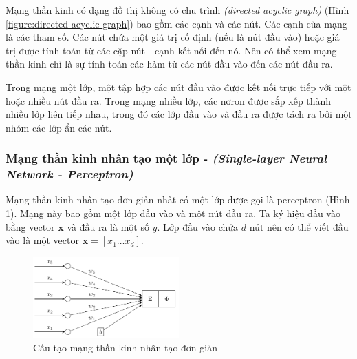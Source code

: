 Mạng thần kinh có dạng đồ thị không có chu trình \textit{(directed acyclic graph)} (Hình \ref{figure:directed-acyclic-graph}) bao gồm các cạnh và các nút. Các cạnh của mạng là các tham số. Các nút chứa một giá trị cố định (nếu là nút đầu vào) hoặc giá trị được tính toán từ các cặp nút - cạnh kết nối đến nó. Nên có thể xem mạng thần kinh chỉ là sự tính toán các hàm từ các nút đầu vào đến các nút đầu ra.

Trong mạng một lớp, một tập hợp các nút đầu vào được kết nối trực tiếp với một hoặc nhiều nút đầu ra. Trong mạng nhiều lớp, các nơron được sắp xếp thành nhiều lớp liên tiếp nhau, trong đó các lớp đầu vào và đầu ra được tách ra bởi một nhóm các lớp ẩn các nút.

\subsubsection{Mạng thần kinh nhân tạo một lớp - \textit{(Single-layer Neural Network - Perceptron)}}
Mạng thần kinh nhân tạo đơn giản nhất có một lớp được gọi là perceptron (Hình \ref{figure:single-layer-network}). Mạng này bao gồm một lớp đầu vào và một nút đầu ra. Ta ký hiệu đầu vào bằng vector $\mathbf{x}$ và đầu ra là một số $y$. Lớp đầu vào chứa $d$ nút nên có thể viết đầu vào là một vector $\mathbf{x} = [x_1\dots x_d]$.
\begin{figure}[htb]
    \centering
    \includegraphics[width=0.5\textwidth]{tikz_image/perceptron.pdf}
    \caption{Cấu tạo mạng thần kinh nhân tạo đơn giản}
    \label{figure:single-layer-network}
\end{figure}


